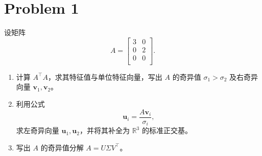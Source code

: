 \section*{Problem 1}

设矩阵 \[
A = \begin{bmatrix}
    3 & 0 \\
    0 & 2 \\
    0 & 0 \\
\end{bmatrix}.
\]
\begin{enumerate}
    \item 计算 $A^\top A$，求其特征值与单位特征向量，写出 $A$ 的奇异值 $\sigma_1 > \sigma_2$ 及右奇异向量 $\boldsymbol{v}_1, \boldsymbol{v}_2$。
    \item 利用公式 \[\boldsymbol{u}_i = \frac{A\boldsymbol{v}_i}{\sigma_i},\] 求左奇异向量 $\boldsymbol{u}_1, \boldsymbol{u}_2$，并将其补全为 $\mathbb{R}^3$ 的标准正交基。
    \item 写出 $A$ 的奇异值分解 $A = U \Sigma V^\top$。
\end{enumerate}

